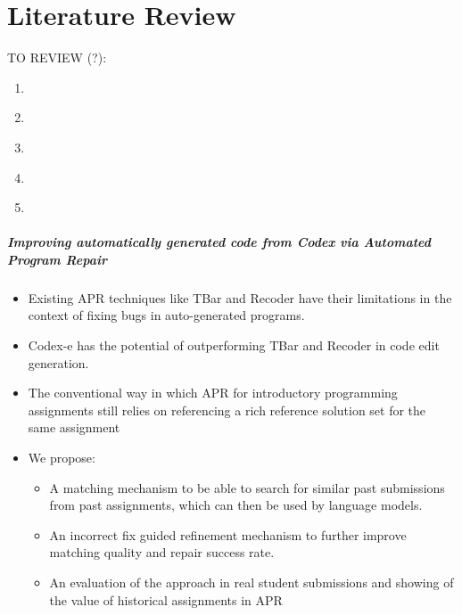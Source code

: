 \chapter{Literature Review}

TO REVIEW (?):

\begin{enumerate}
    \item~\cite{ahmed2022verifix}
    \item~\cite{chen2021evaluating}
    \item~\cite{haldeman2021automated}
    \item~\cite{hu2019re}
    \item~\cite{zhang2022repairing}
\end{enumerate}

\paragraph{Improving automatically generated code from Codex via Automated Program Repair}

\begin{itemize}
    \item Existing APR techniques like TBar and Recoder have their limitations in the context of
          fixing bugs in auto-generated programs.
    \item Codex-e has the potential of outperforming TBar and Recoder in code edit generation.
    \item The conventional way in which APR for introductory programming assignments still relies
          on referencing a rich reference solution set for the same assignment
    \item We propose:
    \begin{itemize}
        \item A matching mechanism to be able to search for similar past submissions from past
              assignments, which can then be used by language models.
        \item An incorrect fix guided refinement mechanism to further improve matching quality
              and repair success rate.
        \item An evaluation of the approach in real student submissions and showing of the value
              of historical assignments in APR
    \end{itemize}
\end{itemize}